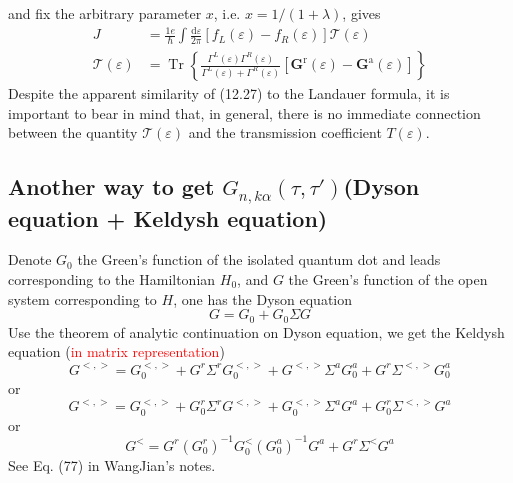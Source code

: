 \documentclass[aps,prb,superscriptaddress]{revtex4-2}
\begin{document}
and fix the arbitrary parameter $x$, i.e. $x=1 /(1+\lambda)$, gives
\begin{equation}
\begin{aligned}
J &=\frac{1 e}{\hbar} \int \frac{\mathrm{d} \varepsilon}{2 \pi}\left[f_{L}(\varepsilon)-f_{R}(\varepsilon)\right] \mathcal{T}(\varepsilon) \\
\mathcal{T}(\varepsilon) &=\operatorname{Tr}\left\{\frac{\Gamma^{L}(\varepsilon) \Gamma^{R}(\varepsilon)}{\Gamma^{L}(\varepsilon)+\Gamma^{R}(\varepsilon)}\left[\mathbf{G}^{\mathrm{r}}(\varepsilon)-\mathbf{G}^{\mathrm{a}}(\varepsilon)\right]\right\}
\end{aligned}
\end{equation}
Despite the apparent similarity of (12.27) to the Landauer formula, it is important to bear in mind that, in general, there is no immediate connection between the quantity $\mathcal{T}(\varepsilon)$ and the transmission coefficient $T(\varepsilon)$.
\subsection{Another way to get $G_{n,k\alpha}(\tau,\tau')$(Dyson equation + Keldysh equation)}
Denote $G_{0}$ the Green’s function of the isolated quantum dot and leads corresponding to the Hamiltonian $H_{0}$, and $G$ the Green’s function of the open system corresponding to $H$, one has the Dyson equation
\begin{equation}
G=G_{0}+G_{0} \Sigma G
\end{equation}
Use the theorem of analytic continuation on Dyson equation, we get the Keldysh equation (\textcolor{red}{in matrix representation})
\begin{equation}
G^{<,>}=G_{0}^{<,>}+G^{r} \Sigma^{r} G_{0}^{<,>}+G^{<,>} \Sigma^{a} G_{0}^{a}+G^{r} \Sigma^{<,>} G_{0}^{a}
\end{equation}
or
\begin{equation}
G^{<,>}=G_{0}^{<,>}+G_{0}^{r} \Sigma^{r} G^{<,>}+G_{0}^{<,>} \Sigma^{a} G^{a}+G_{0}^{r} \Sigma^{<,>} G^{a}
\end{equation}
or
\begin{equation}
G^{<}=G^{r}\left(G_{0}^{r}\right)^{-1} G_{0}^{<}\left(G_{0}^{a}\right)^{-1} G^{a}+G^{r} \Sigma^{<} G^{a}
\end{equation}
See Eq. (77) in WangJian's notes.
\end{document}
